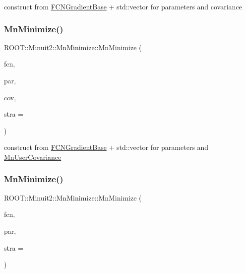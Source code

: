 construct from \mbox{\hyperlink{classROOT_1_1Minuit2_1_1FCNGradientBase}{F\+C\+N\+Gradient\+Base}} + std\+::vector for parameters and covariance 

\mbox{\label{classROOT_1_1Minuit2_1_1MnMinimize_a4f00e31f1d1bd5bd1e8771d9434eb3f7}} 
\subsubsection{\texorpdfstring{MnMinimize()}{MnMinimize()}\hspace{0.1cm}{\footnotesize\ttfamily [9/26]}}
{\footnotesize\ttfamily R\+O\+O\+T\+::\+Minuit2\+::\+Mn\+Minimize\+::\+Mn\+Minimize (\begin{DoxyParamCaption}\item[{const \mbox{\hyperlink{classROOT_1_1Minuit2_1_1FCNGradientBase}{F\+C\+N\+Gradient\+Base}} \&}]{fcn,  }\item[{const std\+::vector$<$ double $>$ \&}]{par,  }\item[{const \mbox{\hyperlink{classROOT_1_1Minuit2_1_1MnUserCovariance}{Mn\+User\+Covariance}} \&}]{cov,  }\item[{unsigned int}]{stra = {} }\end{DoxyParamCaption})\hspace{0.3cm}{\ttfamily [inline]}}



construct from \mbox{\hyperlink{classROOT_1_1Minuit2_1_1FCNGradientBase}{F\+C\+N\+Gradient\+Base}} + std\+::vector for parameters and \mbox{\hyperlink{classROOT_1_1Minuit2_1_1MnUserCovariance}{Mn\+User\+Covariance}} 

\mbox{\label{classROOT_1_1Minuit2_1_1MnMinimize_a7ae2da481677eb3b7fcf3b77a8dee92b}} 
\subsubsection{\texorpdfstring{MnMinimize()}{MnMinimize()}\hspace{0.1cm}{\footnotesize\ttfamily [10/26]}}
{\footnotesize\ttfamily R\+O\+O\+T\+::\+Minuit2\+::\+Mn\+Minimize\+::\+Mn\+Minimize (\begin{DoxyParamCaption}\item[{const \mbox{\hyperlink{classROOT_1_1Minuit2_1_1FCNGradientBase}{F\+C\+N\+Gradient\+Base}} \&}]{fcn,  }\item[{const \mbox{\hyperlink{classROOT_1_1Minuit2_1_1MnUserParameters}{Mn\+User\+Parameters}} \&}]{par,  }\item[{unsigned int}]{stra = {} }\end{DoxyParamCaption})\hspace{0.3cm}{\ttfamily [inline]}}



